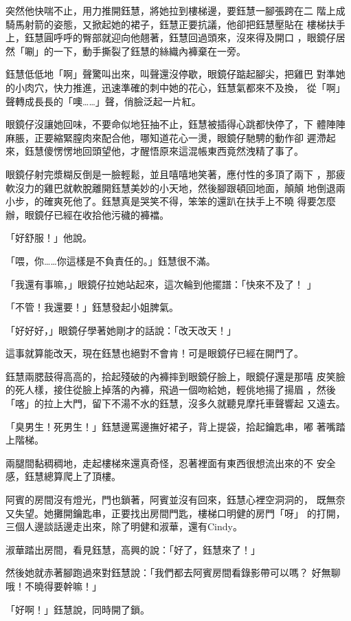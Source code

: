 突然他快喘不止，用力推開鈺慧，將她拉到樓梯邊，要鈺慧一腳張跨在二
階上成騎馬射箭的姿態，又掀起她的裙子，鈺慧正要抗議，他卻把鈺慧壓貼在
樓梯扶手上，鈺慧圓呼呼的臀部就迎向他翹著，鈺慧回過頭來，沒來得及開口
，眼鏡仔居然「唰」的一下，動手撕裂了鈺慧的絲織內褲棄在一旁。

鈺慧低低地「啊」聲驚叫出來，叫聲還沒停歇，眼鏡仔踮起腳尖，把雞巴
對準她的小肉穴，快力推進，迅速準確的刺中她的花心，鈺慧氣都來不及換，
從「啊」聲轉成長長的「噢……」聲，俏臉泛起一片紅。

眼鏡仔沒讓她回味，不要命似地狂抽不止，鈺慧被插得心跳都快停了，下
體陣陣麻脹，正要縮緊膣肉來配合他，哪知道花心一燙，眼鏡仔馳騁的動作卻
遲滯起來，鈺慧傻愣愣地回頭望他，才醒悟原來這混帳東西竟然洩精了事了。

眼鏡仔射完漿糊反倒是一臉輕鬆，並且嘻嘻地笑著，應付性的多頂了兩下
，那疲軟沒力的雞巴就軟脫離開鈺慧美妙的小天地，然後腳跟頓回地面，顛顛
地倒退兩小步，的確爽死他了。鈺慧真是哭笑不得，笨笨的還趴在扶手上不曉
得要怎麼辦，眼鏡仔已經在收拾他污穢的褲襠。

「好舒服！」他說。

「喂，你……你這樣是不負責任的。」鈺慧很不滿。

「我還有事嘛，」眼鏡仔拉她站起來，這次輪到他擺譜：「快來不及了！
」

「不管！我還要！」鈺慧發起小姐脾氣。

「好好好，」眼鏡仔學著她剛才的話說：「改天改天！」

這事就算能改天，現在鈺慧也絕對不會肯！可是眼鏡仔已經在開門了。

鈺慧兩腮鼓得高高的，拾起殘破的內褲摔到眼鏡仔臉上，眼鏡仔還是那嘻
皮笑臉的死人樣，接住從臉上掉落的內褲，飛過一個吻給她，輕佻地揚了揚眉
，然後「喀」的拉上大門，留下不湯不水的鈺慧，沒多久就聽見摩托車聲響起
又遠去。

「臭男生！死男生！」鈺慧邊罵邊撫好裙子，背上提袋，拾起鑰匙串，嘟
著嘴踏上階梯。

兩腿間黏稠稠地，走起樓梯來還真奇怪，忍著裡面有東西很想流出來的不
安全感，鈺慧總算爬上了頂樓。

阿賓的房間沒有燈光，門也鎖著，阿賓並沒有回來，鈺慧心裡空洞洞的，
既無奈又失望。她攤開鑰匙串，正要找出房間門匙，樓梯口明健的房門「呀」
的打開，三個人邊談話邊走出來，除了明健和淑華，還有Cindy。

淑華踏出房間，看見鈺慧，高興的說：「好了，鈺慧來了！」

然後她就赤著腳跑過來對鈺慧說：「我們都去阿賓房間看錄影帶可以嗎？
好無聊哦！不曉得要幹嘛！」

「好啊！」鈺慧說，同時開了鎖。


